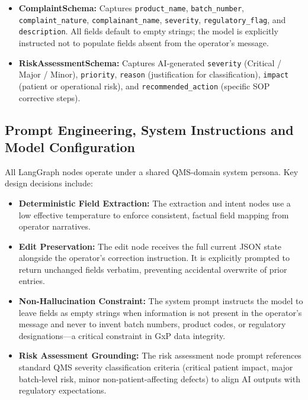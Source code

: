 \documentclass[12pt,a4paper]{report}
\begin{document}
\begin{itemize}[leftmargin=*]
\item \textbf{ComplaintSchema:} Captures \texttt{product\_name}, \texttt{batch\_number}, \texttt{complaint\_nature}, \texttt{complainant\_name}, \texttt{severity}, \texttt{regulatory\_flag}, and \texttt{description}. All fields default to empty strings; the model is explicitly instructed not to populate fields absent from the operator's message.
\item \textbf{RiskAssessmentSchema:} Captures AI-generated \texttt{severity} (Critical / Major / Minor), \texttt{priority}, \texttt{reason} (justification for classification), \texttt{impact} (patient or operational risk), and \texttt{recommended\_action} (specific SOP corrective steps).
\end{itemize}

\subsection{Prompt Engineering, System Instructions and Model Configuration}

All LangGraph nodes operate under a shared QMS-domain system persona. Key design decisions include:

\begin{itemize}[leftmargin=*]
\item \textbf{Deterministic Field Extraction:} The extraction and intent nodes use a low effective temperature to enforce consistent, factual field mapping from operator narratives.
\item \textbf{Edit Preservation:} The edit node receives the full current JSON state alongside the operator's correction instruction. It is explicitly prompted to return unchanged fields verbatim, preventing accidental overwrite of prior entries.
\item \textbf{Non-Hallucination Constraint:} The system prompt instructs the model to leave fields as empty strings when information is not present in the operator's message and never to invent batch numbers, product codes, or regulatory designations---a critical constraint in GxP data integrity.
\item \textbf{Risk Assessment Grounding:} The risk assessment node prompt references standard QMS severity classification criteria (critical patient impact, major batch-level risk, minor non-patient-affecting defects) to align AI outputs with regulatory expectations.
\end{itemize}
\end{document}
